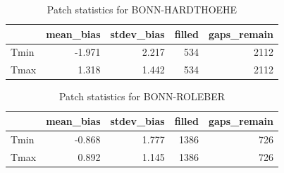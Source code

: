 \documentclass[
]{book}
\newenvironment{Shaded}{\begin{snugshade}}{\end{snugshade}}
\newcommand{\DataTypeTok}[1]{\textcolor[rgb]{0.13,0.29,0.53}{#1}}
\newcommand{\DecValTok}[1]{\textcolor[rgb]{0.00,0.00,0.81}{#1}}
\newcommand{\KeywordTok}[1]{\textcolor[rgb]{0.13,0.29,0.53}{\textbf{#1}}}
\newcommand{\NormalTok}[1]{#1}
\newcommand{\OperatorTok}[1]{\textcolor[rgb]{0.81,0.36,0.00}{\textbf{#1}}}
\newcommand{\StringTok}[1]{\textcolor[rgb]{0.31,0.60,0.02}{#1}}
\begin{document}
\begin{table}

\caption{\label{tab:unnamed-chunk-11}Patch statistics for BONN-HARDTHOEHE}
\fontsize{10}{12}\selectfont
\begin{tabular}[t]{l|r|r|r|r}
\hline
  & mean\_bias & stdev\_bias & filled & gaps\_remain\\
\hline
Tmin & -1.971 & 2.217 & 534 & 2112\\
\hline
Tmax & 1.318 & 1.442 & 534 & 2112\\
\hline
\end{tabular}
\end{table}

\begin{Shaded}
\end{Shaded}

\begin{table}

\caption{\label{tab:unnamed-chunk-12}Patch statistics for BONN-ROLEBER}
\fontsize{10}{12}\selectfont
\begin{tabular}[t]{l|r|r|r|r}
\hline
  & mean\_bias & stdev\_bias & filled & gaps\_remain\\
\hline
Tmin & -0.868 & 1.777 & 1386 & 726\\
\hline
Tmax & 0.892 & 1.145 & 1386 & 726\\
\hline
\end{tabular}
\end{table}

\begin{Shaded}
\end{Shaded}
\end{document}
